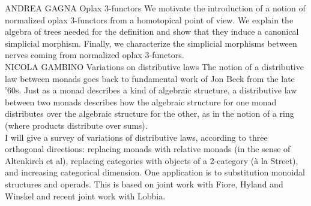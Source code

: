 \documentclass[a3paper]{article}
\begin{document}


\talk
  {ANDREA GAGNA}
  {Oplax 3-functors}
  {We motivate the introduction of a notion of normalized oplax 3-functors from a homotopical point of view. We explain the algebra of trees needed for the definition and show that they induce a canonical simplicial morphism. Finally, we characterize the simplicial morphisms between nerves coming from normalized oplax 3-functors.}\\[1em]

\talk
  {NICOLA GAMBINO}
  {Variations on distributive laws}
  {The notion of a distributive law between monads goes back to fundamental work of Jon Beck from the late '60s. Just as a monad describes a kind of algebraic structure, a distributive law between two monads describes how the algebraic structure for one monad distributes over the algebraic structure for the other, as in the notion of a ring (where products distribute over sums). \\
  \indent I will give a survey of variations of distributive laws, according to three orthogonal directions: replacing monads with relative monads (in the sense of Altenkirch et al), replacing categories with objects of a 2-category (à la Street), and increasing categorical dimension. One application is to substitution monoidal structures and operads. This is based on joint work with Fiore, Hyland and Winskel and recent joint work with Lobbia.}


\end{document}
